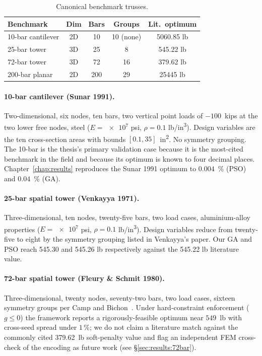 \begin{table}[htbp]
  \centering
  \caption{Canonical benchmark trusses.}
  \label{tab:benchmarks}
  \begin{tabular}{lcccc}
    \toprule
    Benchmark & Dim & Bars & Groups & Lit.\ optimum \\
    \midrule
    10-bar cantilever \cite{sunar1991}   & 2D & 10  & 10 (none) & \num{5060.85} lb \\
    25-bar tower \cite{venkayya1971}     & 3D & 25  & 8         & \num{545.22} lb  \\
    72-bar tower \cite{fleury1980}       & 3D & 72  & 16        & \num{379.62} lb  \\
    200-bar planar \cite{kaveh2010}      & 2D & 200 & 29        & \num{25445} lb   \\
    \bottomrule
  \end{tabular}
\end{table}

\paragraph{10-bar cantilever (Sunar 1991).} Two-dimensional, six
nodes, ten bars, two vertical point loads of $-\num{100}$~kips at
the two lower free nodes, steel ($E = \num{e7}$ psi,
$\rho = \num{0.1}$ lb/in\textsuperscript{3}). Design variables are
the ten cross-section areas with bounds $[\num{0.1},
\num{35}]$~in\textsuperscript{2}. No symmetry grouping. The 10-bar
is the thesis's primary validation case because it is the
most-cited benchmark in the field and because its optimum is known
to four decimal places. Chapter~\ref{chap:results} reproduces the
Sunar 1991 optimum to $\num{0.004}$~\% (PSO) and $\num{0.04}$~\%
(GA).

\paragraph{25-bar spatial tower (Venkayya 1971).} Three-dimensional,
ten nodes, twenty-five bars, two load cases, aluminium-alloy
properties ($E = \num{e7}$ psi, $\rho = \num{0.1}$
lb/in\textsuperscript{3}). Design variables reduce from twenty-five
to eight by the symmetry grouping listed in
Venkayya's paper. Our GA and PSO reach \num{545.30} and \num{545.26}
lb respectively against the \num{545.22} lb literature value.

\paragraph{72-bar spatial tower (Fleury \& Schmit 1980).}
Three-dimensional, twenty nodes, seventy-two bars, two load cases,
sixteen symmetry groups per Camp and Bichon~\cite{camp2004}. Under
hard-constraint enforcement ($g \le 0$) the framework reports a
rigorously-feasible optimum near $\num{549}$~lb with cross-seed
spread under $\num{1}\,\%$; we do not claim a literature match
against the commonly cited \num{379.62}~lb soft-penalty value and
flag an independent FEM cross-check of the encoding as future
work (see \S\ref{sec:results:72bar}).

